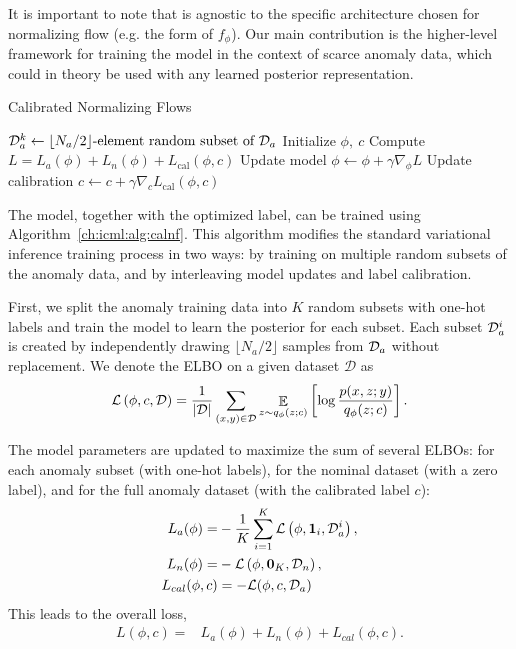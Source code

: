 It is important to note that \ouralg{} is agnostic to the specific architecture chosen for normalizing flow (e.g. the form of $f_\phi$). Our main contribution is the higher-level framework for training the model in the context of scarce anomaly data, which could in theory be used with any learned posterior representation.

\begin{algorithm}[tb]
    \caption{Calibrated Normalizing Flows}
    \label{ch:icml:alg:calnf}
    \DontPrintSemicolon
    {
        $\mathcal{D}_a^k \gets \text{$\lfloor N_a/2 \rfloor$-element random subset of } \mathcal{D}_a$\;
    }
    Initialize $\phi,\ c$\;
    {
        Compute $L = L_a(\phi) + L_n(\phi) + L_{\text{cal}}(\phi, c)$\;
        Update model $\phi \gets \phi + \gamma \nabla_\phi L$\;
        Update calibration $c \gets c + \gamma \nabla_c L_{\text{cal}}(\phi, c)$\;
    }
\end{algorithm}

The \ouralg{} model, together with the optimized label, can be trained using Algorithm~\ref{ch:icml:alg:calnf}. This algorithm modifies the standard variational inference training process in two ways: by training on multiple random subsets of the anomaly data, and by interleaving model updates and label calibration.

First, we split the anomaly training data into $K$ random subsets with one-hot labels and train the model to learn the posterior for each subset. Each subset $\mathcal{D}_a^i$ is created by independently drawing $\lfloor N_a/2 \rfloor$ samples from $\mathcal{D}_a$ without replacement. We denote the ELBO on a given dataset $\mathcal{D}$ as
\begin{equation}
    \mathcal{L}\left( \phi, c, \mathcal{D} \right) = \frac{1}{\left| \mathcal{D} \right|} \sum_{(x, y) \in \mathcal{D}} \mathop{\mathbb{E}}_{z\sim q_{\phi}(z; c)}\left[ \log \frac{p(x, z; y)}{q_\phi(z; c)} \right].
\end{equation}

The model parameters are updated to maximize the sum of several ELBOs: for each anomaly subset (with one-hot labels), for the nominal dataset (with a zero label), and for the full anomaly dataset (with the calibrated label $c$):
\begin{align}
    L_{a}(\phi) =    & -\frac{1}{K} \sum_{i=1}^K \mathcal{L}\left( \phi, \mathbf{1}_i, \mathcal{D}_a^i \right), \\
    L_{n}(\phi) =    & -\mathcal{L}\left( \phi, \mathbf{0}_K, \mathcal{D}_n \right),                            \\
    L_{cal}(\phi, c) & = -\mathcal{L}(\phi, c, \mathcal{D}_a)
\end{align}
This leads to the overall loss,
\begin{align}
    L(\phi, c) = & L_{a}(\phi) + L_{n}(\phi) + L_{cal}(\phi, c).
\end{align}

